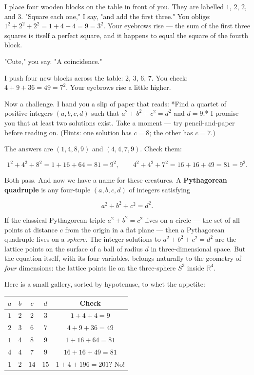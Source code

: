 \documentclass[12pt, letterpaper, openany]{book}
\theoremstyle{definition}
\theoremstyle{remark}
\begin{document}
I place four wooden blocks on the table in front of you. They are labelled $1$, $2$, $2$, and $3$. "Square each one," I say, "and add the first three." You oblige: $1^2 + 2^2 + 2^2 = 1 + 4 + 4 = 9 = 3^2$. Your eyebrows rise --- the sum of the first three squares is itself a perfect square, and it happens to equal the square of the fourth block.

"Cute," you say. "A coincidence."

I push four new blocks across the table: $2$, $3$, $6$, $7$. You check: $4 + 9 + 36 = 49 = 7^2$. Your eyebrows rise a little higher.

Now a challenge. I hand you a slip of paper that reads: *Find a quartet of positive integers $(a, b, c, d)$ such that $a^2 + b^2 + c^2 = d^2$ and $d = 9$.* I promise you that at least two solutions exist. Take a moment --- try pencil-and-paper before reading on. (Hints: one solution has $c = 8$; the other has $c = 7$.)

The answers are $(1, 4, 8, 9)$ and $(4, 4, 7, 9)$. Check them:

\[
1^2 + 4^2 + 8^2 = 1 + 16 + 64 = 81 = 9^2, \qquad 4^2 + 4^2 + 7^2 = 16 + 16 + 49 = 81 = 9^2.
\]

Both pass. And now we have a name for these creatures. A \textbf{Pythagorean quadruple} is any four-tuple $(a, b, c, d)$ of integers satisfying

\[
a^2 + b^2 + c^2 = d^2.
\]

If the classical Pythagorean triple $a^2 + b^2 = c^2$ lives on a circle --- the set of all points at distance $c$ from the origin in a flat plane --- then a Pythagorean quadruple lives on a \textit{sphere}. The integer solutions to $a^2 + b^2 + c^2 = d^2$ are the lattice points on the surface of a ball of radius $d$ in three-dimensional space. But the equation itself, with its four variables, belongs naturally to the geometry of \textit{four} dimensions: the lattice points lie on the three-sphere $S^3$ inside $\mathbb{R}^4$.

Here is a small gallery, sorted by hypotenuse, to whet the appetite:


\begin{center}
\begin{tabular}{|c|c|c|c|c|}
\hline
$a$ & $b$ & $c$ & $d$ & Check \\
\hline
$1$ & $2$ & $2$ & $3$ & $1+4+4=9$ \\
$2$ & $3$ & $6$ & $7$ & $4+9+36=49$ \\
$1$ & 4 & $8$ & $9$ & $1+16+64=81$ \\
$4$ & $4$ & $7$ & $9$ & $16+16+49=81$ \\
$1$ & $2$ & $14$ & $\!15\!$ & $1+4+196=201$? No! \\
\hline
\end{tabular}
\end{center}
\end{document}

